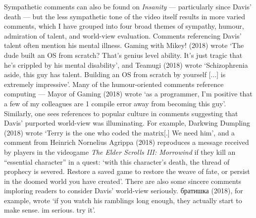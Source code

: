 \documentclass[Draft.tex]{subfiles}
\begin{document}

Sympathetic comments can also be found on \textit{Insanity} --- particularly
since Davis' death --- but the less sympathetic tone of the video itself
results in more varied comments,
which I have grouped into four broad themes of sympathy, humour,
admiration of talent, and world-view evaluation.
Comments referencing Davis' talent often mention his mental illness.
Gaming with Mikey! (2018) wrote `The dude built an OS from scratch?
That's genius level ability. It's just tragic that he's crippled by his
mental disability', and
Teamugi (2018) wrote `Schizophrenia aside, this guy has talent.
Building an OS from scratch by yourself [...] is extremely impressive'.
Many of the humour-oriented comments reference computing ---
Mayor of Gaming (2018) wrote `as a programmer, I'm positive that
a few of my colleagues are 1 compile error away from becoming this guy'.
Similarly, one sees references to popular culture in comments suggesting
that Davis' purported world-view was illuminating.
For example, Darkwing Dumpling (2018) wrote
`Terry is the one who coded the matrix[.] We need him',
and a comment from Heinrich Nornelius Agrippa (2018)
reproduces a message received by players in the videogame
\textit{The Elder Scrolls III: Morrowind} if they kill an
``essential character'' in a quest:
`with this character's death,
the thread of prophecy is severed.
Restore a saved game to restore the weave of fate,
or persist in the doomed world you have created'.
There are also some sincere comments imploring readers to
consider Davis' world-view seriously.
\foreignlanguage{russian}{братишка} (2018), for example, wrote
`if you watch his ramblings long enough,
they actually start to make sense. im serious. try it'.
\end{document}
